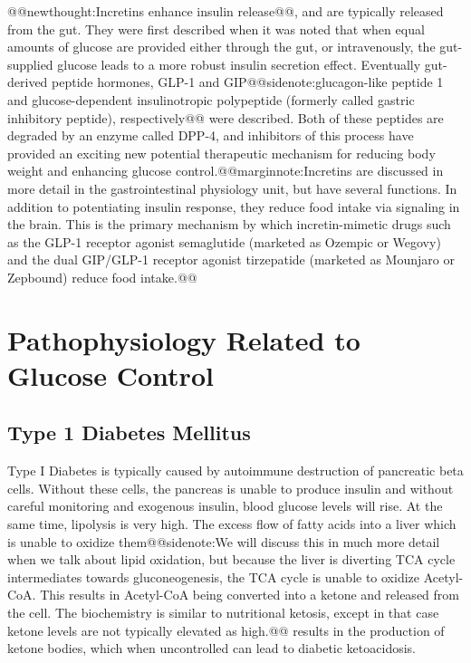 \documentclass{tufte-handout}
\makeatletter
\def\newthought#1{@@newthought:#1@@}
\def\marginnote#1{@@marginnote:#1@@}
\def\sidenote#1{@@sidenote:#1@@}
\makeatother
\begin{document}
\newthought{Incretins enhance insulin release}, and are typically released from the gut.  They were first described when it was noted that when equal amounts of glucose are provided either through the gut, or intravenously, the gut-supplied glucose leads to a more robust insulin secretion effect.  Eventually gut-derived peptide hormones, GLP-1 and GIP\sidenote{glucagon-like peptide 1 and glucose-dependent insulinotropic polypeptide (formerly called gastric inhibitory peptide), respectively} were described.  Both of these peptides are degraded by an enzyme called DPP-4, and inhibitors of this process have provided an exciting new potential therapeutic mechanism for reducing body weight and enhancing glucose control.\marginnote{Incretins are discussed in more detail in the gastrointestinal physiology unit, but have several functions.  In addition to potentiating insulin response, they reduce food intake via signaling in the brain.  This is the primary mechanism by which incretin-mimetic drugs such as the GLP-1 receptor agonist semaglutide (marketed as Ozempic or Wegovy) and the dual GIP/GLP-1 receptor agonist tirzepatide (marketed as Mounjaro or Zepbound) reduce food intake.}

\section{Pathophysiology Related to Glucose Control}

\subsection{Type 1 Diabetes Mellitus}

Type I Diabetes is typically caused by autoimmune destruction of pancreatic beta cells.  Without these cells, the pancreas is unable to produce insulin and without careful monitoring and exogenous insulin, blood glucose levels will rise.  At the same time, lipolysis is very high. The excess flow of fatty acids into a liver which is unable to oxidize them\sidenote{We will discuss this in much more detail when we talk about lipid oxidation, but because the liver is diverting TCA cycle intermediates towards gluconeogenesis, the TCA cycle is unable to oxidize Acetyl-CoA\index{Metabolites!Acetyl-CoA}\nomenclature{CoA}{Coenzyme A (e.g.\ Acetyl-CoA)}.  This results in Acetyl-CoA being converted into a ketone and released from the cell.  The biochemistry is similar to nutritional ketosis, except in that case ketone levels are not typically elevated as high.} results in the production of ketone bodies, which when uncontrolled can lead to diabetic ketoacidosis.
\end{document}
